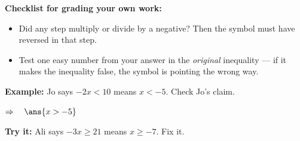 \documentclass[12pt]{article}
\begin{document}

\begin{formulabox}
\textbf{Checklist for grading your own work:}
\begin{itemize}[leftmargin=1.2cm, itemsep=1pt, topsep=2pt]
  \item Did any step multiply or divide by a negative? Then the symbol must
        have reversed in that step.
  \item Test one easy number from your answer in the \emph{original}
        inequality --- if it makes the inequality false, the symbol is
        pointing the wrong way.
\end{itemize}
\end{formulabox}

\begin{examplebox}
\textbf{Example:} \quad Jo says $-2x < 10$ means $x < -5$. Check Jo's claim.

$\Rightarrow\quad \ans{x > -5}$
\end{examplebox}

\begin{tryitbox}
\textbf{Try it:} \quad Ali says $-3x \ge 21$ means $x \ge -7$. Fix it.\\[2pt]
\end{tryitbox}
\end{document}
